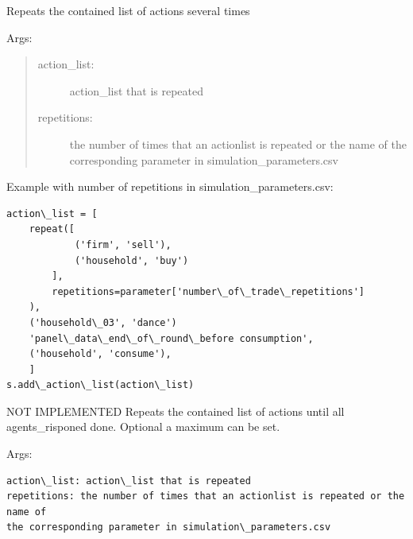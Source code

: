 \documentclass[letterpaper,10pt,english]{sphinxmanual}
\begin{document}
\begin{fulllineitems}
\label{simulation:abce.repeat}
Repeats the contained list of actions several times

Args:
\begin{quote}
\begin{description}
\item[{action\_list:}] \leavevmode
action\_list that is repeated

\item[{repetitions:}] \leavevmode
the number of times that an actionlist is repeated or the name of
the corresponding parameter in simulation\_parameters.csv

\end{description}
\end{quote}

Example with number of repetitions in simulation\_parameters.csv:

\begin{Verbatim}[commandchars=\\\{\}]
action\_list = [
    repeat([
            ('firm', 'sell'),
            ('household', 'buy')
        ],
        repetitions=parameter['number\_of\_trade\_repetitions']
    ),
    ('household\_03', 'dance')
    'panel\_data\_end\_of\_round\_before consumption',
    ('household', 'consume'),
    ]
s.add\_action\_list(action\_list)
\end{Verbatim}

\end{fulllineitems}


\begin{fulllineitems}
\label{simulation:abce.repeat_while}
NOT IMPLEMENTED Repeats the contained list of actions until all agents\_risponed
done. Optional a maximum can be set.

Args:

\begin{Verbatim}[commandchars=\\\{\}]
action\_list: action\_list that is repeated
repetitions: the number of times that an actionlist is repeated or the name of
the corresponding parameter in simulation\_parameters.csv
\end{Verbatim}

\end{fulllineitems}
\end{document}
